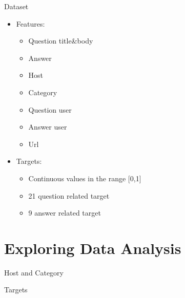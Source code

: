 \documentclass[
 size=12pt,
 paper=smartboard, %
 mode=present, %
 display=slides, %
style=tuliplab,
pauseslide,
fleqn,leqno]{powerdot}
\begin{document}
\begin{slide}{Dataset}
    \begin{itemize}
        \item Features:
        \begin{itemize}
            \item Question title\&body
            \item Answer
            \item Host
            \item Category
            \item Question user
            \item Answer user
            \item Url
        \end{itemize}
        \item Targets:
        \begin{itemize}
            \item Continuous values in the range [0,1]
            \item 21 question related target
            \item 9 answer related target
        \end{itemize}
    \end{itemize}
\end{slide}
\section{Exploring Data Analysis}
\begin{slide}{Host and Category}
\begin{slide}{Targets}

\end{slide}
\end{slide}
\end{document}
